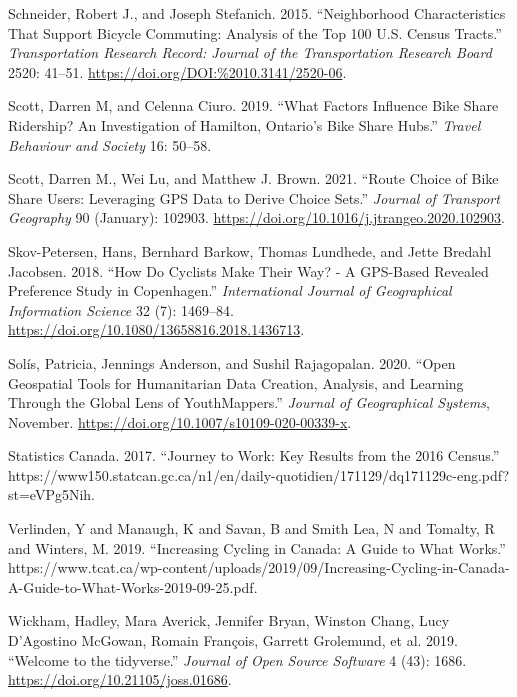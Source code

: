 \documentclass[smallextended]{svjour3}       %
\begin{document}
\leavevmode\hypertarget{ref-Schneider2015}{}%
Schneider, Robert J., and Joseph Stefanich. 2015. ``Neighborhood
Characteristics That Support Bicycle Commuting: Analysis of the Top 100
U.S. Census Tracts.'' \emph{Transportation Research Record: Journal of
the Transportation Research Board} 2520: 41--51.
\url{https://doi.org/DOI:\%2010.3141/2520-06}.

\leavevmode\hypertarget{ref-Scott2019factors}{}%
Scott, Darren M, and Celenna Ciuro. 2019. ``What Factors Influence Bike
Share Ridership? An Investigation of Hamilton, Ontario's Bike Share
Hubs.'' \emph{Travel Behaviour and Society} 16: 50--58.

\leavevmode\hypertarget{ref-scottRouteChoiceBike2021}{}%
Scott, Darren M., Wei Lu, and Matthew J. Brown. 2021. ``Route Choice of
Bike Share Users: Leveraging GPS Data to Derive Choice Sets.''
\emph{Journal of Transport Geography} 90 (January): 102903.
\url{https://doi.org/10.1016/j.jtrangeo.2020.102903}.

\leavevmode\hypertarget{ref-SkovPetersen2018}{}%
Skov-Petersen, Hans, Bernhard Barkow, Thomas Lundhede, and Jette Bredahl
Jacobsen. 2018. ``How Do Cyclists Make Their Way? - A GPS-Based Revealed
Preference Study in Copenhagen.'' \emph{International Journal of
Geographical Information Science} 32 (7): 1469--84.
\url{https://doi.org/10.1080/13658816.2018.1436713}.

\leavevmode\hypertarget{ref-solisOpenGeospatialTools2020}{}%
Solís, Patricia, Jennings Anderson, and Sushil Rajagopalan. 2020. ``Open
Geospatial Tools for Humanitarian Data Creation, Analysis, and Learning
Through the Global Lens of YouthMappers.'' \emph{Journal of Geographical
Systems}, November. \url{https://doi.org/10.1007/s10109-020-00339-x}.

\leavevmode\hypertarget{ref-Statscan2017}{}%
Statistics Canada. 2017. ``Journey to Work: Key Results from the 2016
Census.''
https://www150.statcan.gc.ca/n1/en/daily-quotidien/171129/dq171129c-eng.pdf?st=eVPg5Nih.

\leavevmode\hypertarget{ref-Verlinden2019}{}%
Verlinden, Y and Manaugh, K and Savan, B and Smith Lea, N and Tomalty, R
and Winters, M. 2019. ``Increasing Cycling in Canada: A Guide to What
Works.''
https://www.tcat.ca/wp-content/uploads/2019/09/Increasing-Cycling-in-Canada-A-Guide-to-What-Works-2019-09-25.pdf.

\leavevmode\hypertarget{ref-Wickham2019}{}%
Wickham, Hadley, Mara Averick, Jennifer Bryan, Winston Chang, Lucy
D'Agostino McGowan, Romain François, Garrett Grolemund, et al. 2019.
``Welcome to the tidyverse.'' \emph{Journal of Open Source Software} 4
(43): 1686. \url{https://doi.org/10.21105/joss.01686}.
\end{document}
